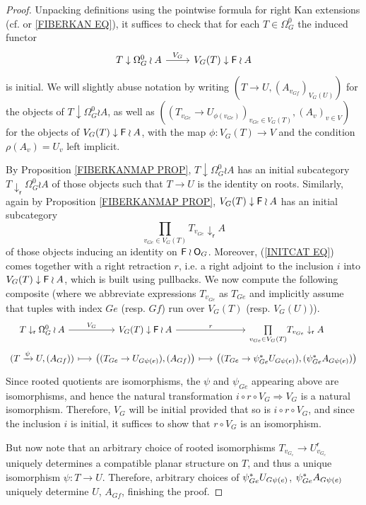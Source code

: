 \documentclass[a4paper,10pt]{article}%
\begin{document}
\begin{proof}
	Unpacking definitions using the pointwise formula for right  Kan extensions (cf. \cite[X.3 Thm. 1]{McL} or \eqref{FIBERKAN EQ}), 
	it suffices to check that for each $T \in \Omega_{G}^{0}$ the induced functor
\[
\begin{tikzcd}
	T \downarrow \Omega_{G}^{0} \wr A \ar{r}{V_G} & 
	V_G(T) \downarrow \Fin \wr A
\end{tikzcd}
\]
is initial.
We will slightly abuse notation by writing 
$(T \to U, (A_{v_{G f}})_{V_G(U)})$ for the objects of 
$T \downarrow \Omega_{G}^{0} \wr A$,
as well as 
$
\left(
	(T_{v_{G e}} \to U_{\phi(v_{Ge})})_{v_{G e} \in V_G(T)},
	(A_v)_{v \in V}
\right)
$
for the objects of 
$V_G(T) \downarrow \mathsf{F} \wr A$,
with the map $\phi \colon V_G(T) \to V$ and the condition 
$\rho(A_v) = U_v$ left implicit.

By Proposition \ref{FIBERKANMAP PROP}, $T \downarrow \Omega_{G}^{0} \wr A$ has an initial subcategory
$T \downarrow_{\mathsf{r}} \Omega_{G}^{0} \wr A$
of those objects such that $T \to U$ is the identity on roots. 
Similarly, again by Proposition \ref{FIBERKANMAP PROP},
$V_G(T) \downarrow \mathsf{F} \wr A$
has an initial subcategory
\begin{equation}\label{INITCAT EQ}
	\prod_{v_{Ge} \in V_G(T)} 
	T_{v_{Ge}} \downarrow_{\mathsf{r}} A
\end{equation}
of those objects inducing an identity on $\mathsf{F} \wr \mathsf{O}_G$. Moreover, 
(\ref{INITCAT EQ}) comes together with a right retraction $r$,
i.e. a right adjoint to the inclusion $i$ into $V_G(T) \downarrow \mathsf{F} \wr A$, 
which is built using pullbacks. 
We now compute the following composite
(where we abbreviate expressions $T_{v_{G e}}$ as 
$T_{Ge}$ and implicitly assume that tuples with index $G e$ (resp. $G f$) run over $V_G(T)$ (resp. $V_G(U)$)).
\[
\begin{tikzcd}[column sep =1.5em , row sep =0em]
	T \downarrow_{\mathsf{r}} \Omega_{G}^{0} \wr A 
	\ar{r}{V_G} &
	V_G(T) \downarrow \Fin \wr A \ar{r}{r} &
	\underset{v_{Ge} \in V_G(T)}{\prod} 
	T_{v_{Ge}} \downarrow_{\mathsf{r}} A
\\
	(T \xrightarrow{\psi} U, (A_{{G f}})) \ar[mapsto]{r} &
	\left(
		(T_{{G e}} \to U_{{G \psi(e)}}),
		(A_{{G f}})
	\right) \ar[mapsto]{r} &
	\left(
		(T_{{G e}} \to \psi_{G e}^{\**} U_{{G \psi(e)}}),
		(\psi_{G e}^{\**} A_{{G \psi(e)}})
	\right)
\end{tikzcd}
\]
Since rooted quotients are isomorphisms, the $\psi$
and $\psi_{Ge}$ appearing above are isomorphisms, 
and hence the natural transformation
$i \circ r \circ V_G \Rightarrow V_G$
is a natural isomorphism. 
Therefore,
$V_G$ will be initial provided that so is
$i \circ r \circ V_G$,
and since the inclusion $i$ is initial, it suffices to show that
$r \circ V_G$ is an isomorphism.

But now note that an arbitrary choice of rooted isomorphisms
$T_{v_{G_e}} \to U^{\mathsf{r}}_{v_{G_e}}$
uniquely determines a compatible planar structure on $T$, and thus a unique isomorphism $\psi \colon T \to U$.
Therefore, arbitrary choices of 
$\psi_{G e}^{\**} U_{{G \psi(e)}}$,
$\psi_{G e}^{\**} A_{{G \psi(e)}}$
uniquely determine $U$, $A_{G f}$, finishing the proof.
\end{proof}
\end{document}
